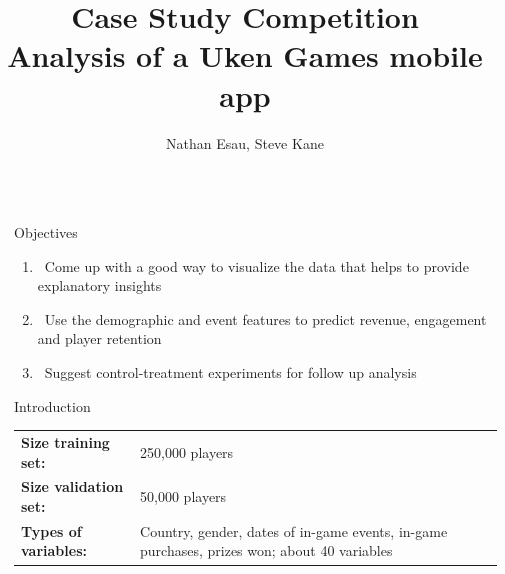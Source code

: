 \documentclass[final,size=a3]{beamer}
\title{Case Study Competition \\ \vspace{8mm} \normalsize{Analysis of a Uken Games mobile app} \vspace{-5mm}}
\author{Nathan Esau, Steve Kane}
\institute{September 2015}
\newlength{\sepwid}
\newlength{\onecolwid}
\begin{document}



\setlength{\belowcaptionskip}{0ex} 

\setlength\belowdisplayshortskip{2ex} 

\begin{frame}[t] 


\begin{columns}[t]

\begin{column}{\sepwid}
\end{column} %

\begin{column}{\onecolwid} 

\begin{alertblock}{Objectives}
\normalsize
\begin{addmargin}[0.5em]{0em}
\begin{enumerate}[1.]
\item \ Come up with a good way to visualize the data that helps to provide explanatory insights
\item \ Use the demographic and event features to predict revenue, engagement and player retention
\item \ Suggest control-treatment experiments for follow up analysis
\end{enumerate}
\end{addmargin}

\end{alertblock}

\begin{block}{Introduction}

\begin{tabular}{l p{13cm}}
\textbf{Size training set: } & 250,000 players \\
\textbf{Size validation set: } & 50,000 players \\ 
\textbf{Types of variables: } & Country, gender, dates of in-game events, in-game purchases, prizes won; about 40 variables
\end{tabular}


\end{block}
\end{column}
\end{columns}
\end{frame}
\end{document}
